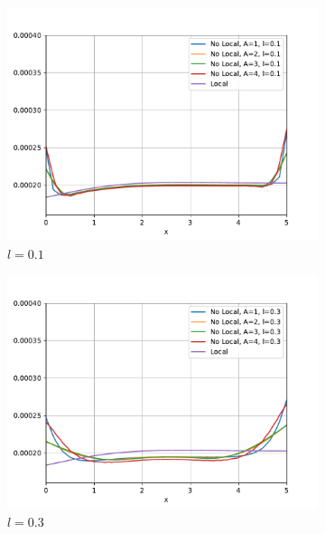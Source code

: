 		\begin{figure}
		    \centering
		    \sffamily
		    \begin{subfigure}{0.48\textwidth}
		    \centering
		        \includegraphics[width=\textwidth]{figuras/Placa/Perfiles/Y/Y0.1_2.519.pdf}
		        \caption{$l=0.1$}
		        \label{fig:perfilesY0259.01}
		    \end{subfigure}
		    \begin{subfigure}{0.48\textwidth}
		    \centering
		        \includegraphics[width=\textwidth]{figuras/Placa/Perfiles/Y/Y0.3_2.519.pdf}
		        \caption{$l=0.3$}
		        \label{fig:perfilesY0259.03}
		    \end{subfigure}
		    \quad
		    \begin{subfigure}{0.48\textwidth}

\end{subfigure}
\end{figure}
